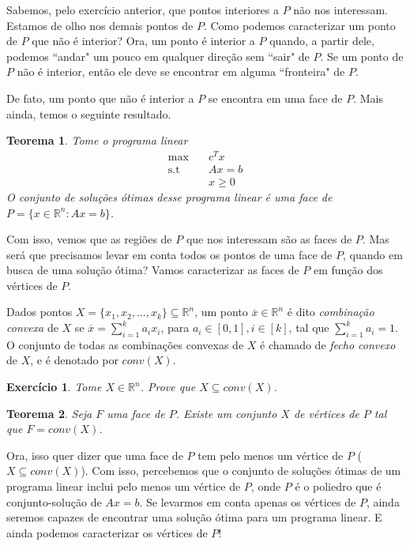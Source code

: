 \documentclass[]{article}
\newtheorem{teorema}{Teorema}
\newtheorem{exercicio}{Exercício}
\numberwithin{equation}{section}
\begin{document}
Sabemos, pelo exercício anterior, que pontos interiores a $P$ não nos interessam.
Estamos de olho nos demais pontos de $P$.
Como podemos caracterizar um ponto de $P$ que não é interior?
Ora, um ponto é interior a $P$ quando, a partir dele, podemos ``andar" um pouco em qualquer direção
sem ``sair" de $P$.
Se um ponto de $P$ não é interior, então ele deve se encontrar em alguma ``fronteira" de $P$.

De fato, um ponto que não é interior a $P$ se encontra em uma face de $P$.
Mais ainda, temos o seguinte resultado.

\begin{teorema}
  Tome o programa linear
  \begin{align}
  \max        &\quad  c^Tx \\
  \text{s.t}  &\quad  Ax = b \\
              &\quad  x \geq 0
  \end{align}
  O conjunto de soluções ótimas desse programa linear é uma face de
  $P = \{x \in \mathbb{R}^n : Ax = b\}$.
\end{teorema}

Com isso, vemos que as regiões de $P$ que nos interessam são as faces de $P$.
Mas será que precisamos levar em conta todos os pontos de uma face de $P$, quando em busca de uma
solução ótima?
Vamos caracterizar as faces de $P$ em função dos vértices de $P$.

Dados pontos $X = \{x_1, x_2, \dots, x_k\} \subseteq \mathbb{R}^n$, um ponto
$\overline{x} \in \mathbb{R}^n$ é dito \emph{combinação convexa} de $X$ se
$\overline{x} = \sum_{i = 1}^k a_ix_i$, para $a_i \in [0, 1], i \in [k]$, tal que
$\sum_{i = 1}^k a_i = 1$.
O conjunto de todas as combinações convexas de $X$ é chamado de \emph{fecho convexo} de $X$, e é
denotado por $conv(X)$.

\begin{exercicio}
  Tome $X \in \mathbb{R}^n$.
  Prove que $X \subseteq conv(X)$.
\end{exercicio}

\begin{teorema}
  Seja $F$ uma face de $P$.
  Existe um conjunto $X$ de vértices de $P$ tal que $F = conv(X)$.
\end{teorema}

Ora, isso quer dizer que uma face de $P$ tem pelo menos um vértice de $P$ ($X \subseteq conv(X)$).
Com isso, percebemos que o conjunto de soluções ótimas de um programa linear inclui pelo menos um
vértice de $P$, onde $P$ é o poliedro que é conjunto-solução de $Ax = b$.
Se levarmos em conta apenas os vértices de $P$, ainda seremos capazes de encontrar uma solução ótima
para um programa linear. E ainda podemos caracterizar os vértices de $P$!
\end{document}
